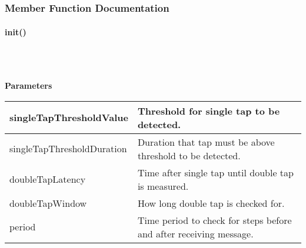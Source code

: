             \\

            \\


    \subsubsection{Member Function Documentation}\mbox{}


        \paragraph{init()}\mbox{}\\

            \\


            \textbf{Parameters}

            \vspace{1em}
            \begin{tabular}{| l | l |} 
                \hline
                singleTapThresholdValue & Threshold for single tap to be detected.\\ 
                \hline
                singleTapThresholdDuration & Duration that tap must be above threshold to be detected.\\ 
                \hline
                doubleTapLatency & Time after single tap until double tap is measured.\\ 
                \hline
                doubleTapWindow & How long double tap is checked for.\\ 
                \hline
                period & Time period to check for steps before and after receiving message.\\ 
                \hline
            \end{tabular}\\~\\


